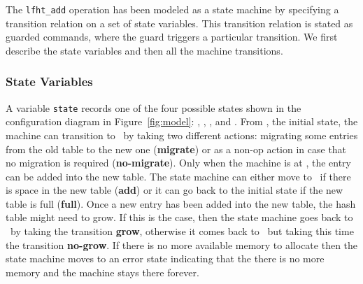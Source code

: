 The \texttt{lfht\_add} operation has been modeled as a state machine
by specifying a transition relation on a set of state variables. This
transition relation is stated as guarded commands, where the guard
triggers a particular transition.  We first describe the state
variables and then all the machine transitions.

\subsubsection{State Variables}

A variable \texttt{state} records one of the four possible states
shown in the configuration diagram in Figure~\ref{fig:model}:
\emph{\pczero}, \emph{\pcone}, \emph{\pctwo}, and \emph{\pcthree}.
%
From \pczero, the initial state, the machine can transition to
\pcone\ by taking two different actions: migrating some entries from
the old table to the new one (\textbf{migrate}) or as a non-op action
in case that no migration is required (\textbf{no-migrate}). Only when
the machine is at \pcone, the entry can be added into the new
table. The state machine can either move to \pctwo\ if there is space
in the new table (\textbf{add}) or it can go back to the initial state
if the new table is full (\textbf{full}). Once a new entry has been
added into the new table, the hash table might need to grow. If this
is the case, then the state machine goes back to \pczero\ by taking
the transition \textbf{grow}, otherwise it comes back to \pczero\ but
taking this time the transition \textbf{no-grow}. If there is no more
available memory to allocate then the state machine moves to an error
state indicating that the there is no more memory and the machine
stays there forever.

